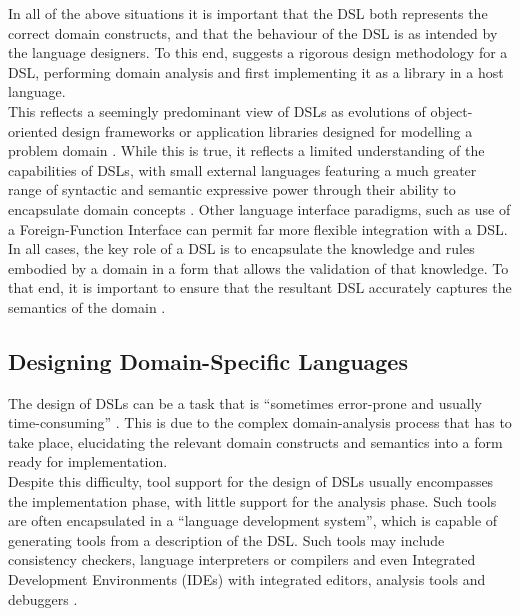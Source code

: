 \documentclass[a4paper,11pt]{report}
\begin{document}
In all of the above situations it is important that the DSL both represents the correct domain constructs, and that the behaviour of the DSL is as intended by the language designers.
To this end, \citet{van2000domain} suggests a rigorous design methodology for a DSL, performing domain analysis and first implementing it as a library in a host language. \\

This reflects a seemingly predominant view of DSLs as evolutions of object-oriented design frameworks or application libraries designed for modelling a problem domain \citep{van2000domain,Mernik:2005:DDL:1118890.1118892}. 
While this is true, it reflects a limited understanding of the capabilities of DSLs, with small external languages featuring a much greater range of syntactic and semantic expressive power through their ability to encapsulate domain concepts \citep{fowler2010domain}.
Other language interface paradigms, such as use of a Foreign-Function Interface can permit far more flexible integration with a DSL.\\

In all cases, the key role of a DSL is to encapsulate the knowledge and rules embodied by a domain in a form that allows the validation of that knowledge. 
To that end, it is important to ensure that the resultant DSL accurately captures the semantics of the domain \citep{fowler2010domain}.


\subsection{Designing Domain-Specific Languages} %
\label{sub:designing_domain_specific_languages}
The design of DSLs can be a task that is ``sometimes error-prone and usually time-consuming'' \citep{karsai2014design}. 
This is due to the complex domain-analysis process that has to take place, elucidating the relevant domain constructs and semantics into a form ready for implementation. \\

Despite this difficulty, tool support for the design of DSLs usually encompasses the implementation phase, with little support for the analysis phase. 
Such tools are often encapsulated in a ``language development system'', which is capable of generating tools from a description of the DSL. 
Such tools may include consistency checkers, language interpreters or compilers and even Integrated Development Environments (IDEs) with integrated editors, analysis tools and debuggers \citep[pg. 19-20]{Mernik:2005:DDL:1118890.1118892}. \\
\end{document}
